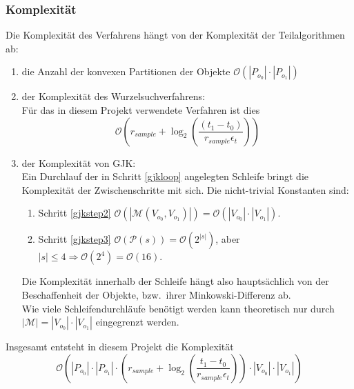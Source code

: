 \subsubsection{Komplexität}
Die Komplexität des Verfahrens hängt von der Komplexität der Teilalgorithmen ab:
\begin{enumerate}
\item die Anzahl der konvexen Partitionen der Objekte $\mathcal{O}(|P_{o_0}|\cdot |P_{o_1}|)$
\item der Komplexität des Wurzelsuchverfahrens:\\
 Für das in diesem Projekt verwendete Verfahren ist dies $$\mathcal{O}(r_{sample} + \log_{2}(\frac{(t_1 - t_0)}{r_{sample}\epsilon_t} ))$$
\item der Komplexität von GJK:\\
Ein Durchlauf der in Schritt \ref{gjkloop} angelegten Schleife bringt die Komplexität der Zwischenschritte mit sich. Die nicht-trivial Konstanten sind:
\begin{enumerate}
\item Schritt \ref{gjkstep2} $\mathcal{O}(|\mathcal{M}(V_{o_0}, V_{o_1})|) = \mathcal{O}(|V_{o_0}|\cdot |V_{o_1}|)$.
\item Schritt \ref{gjkstep3} $\mathcal{O}(\mathcal{P}(s)) = \mathcal{O}(2^{|s|})$, aber $|s| \leq 4 \Rightarrow \mathcal{O}(2^4) = \mathcal{O}(16)$.
\end{enumerate}
Die Komplexität innerhalb der Schleife hängt also hauptsächlich von der Beschaffenheit der Objekte, bzw.~ihrer Minkowski-Differenz ab.\\
Wie viele Schleifendurchläufe benötigt werden kann theoretisch nur durch $|\mathcal{M}| = |V_{o_0}|\cdot |V_{o_1}|$ eingegrenzt werden.
\end{enumerate}
Insgesamt entsteht in diesem Projekt die Komplexität 
$$\mathcal{O}(|P_{o_0}|\cdot |P_{o_1}| \cdot  \left( r_{sample} + \log_{2}\left(\frac{t_1 - t_0}{r_{sample}\epsilon_t}\right)\right) \cdot  |V_{o_0}|\cdot |V_{o_1}| )$$


